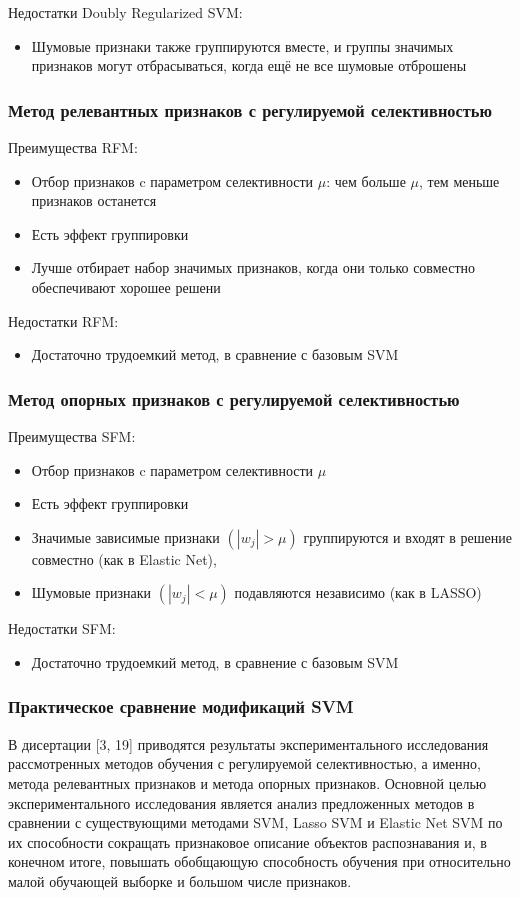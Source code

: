 \documentclass[12pt,a4paper]{article}
\begin{document}
Недостатки Doubly Regularized SVM:
\begin{itemize}
	\item  Шумовые признаки также группируются вместе,
	и группы значимых признаков могут отбрасываться,
	когда ещё не все шумовые отброшены
\end{itemize}

\subsubsection{Метод релевантных признаков с регулируемой селективностью}
Преимущества RFM:
\begin{itemize}
	\item Отбор признаков c параметром селективности $\mu$:
	чем больше $\mu$, тем меньше признаков останется
	\item Есть эффект группировки
	\item Лучше отбирает набор значимых признаков, когда
	они только совместно обеспечивают хорошее решени
\end{itemize}

Недостатки RFM:
\begin{itemize}
	\item Достаточно трудоемкий метод, в сравнение с базовым SVM
\end{itemize}

\subsubsection{Метод опорных признаков с регулируемой селективностью}
Преимущества SFM:
\begin{itemize}
	\item Отбор признаков c параметром селективности $\mu$
	\item Есть эффект группировки
	\item Значимые зависимые признаки $(|w_j| > \mu)$ группируются и входят в решение совместно (как в Elastic Net),
	\item Шумовые признаки $(|w_j| < \mu)$ подавляются независимо
	(как в LASSO)
\end{itemize}

Недостатки SFM:
\begin{itemize}
	\item Достаточно трудоемкий метод, в сравнение с базовым SVM
\end{itemize}

\subsubsection{Практическое сравнение модификаций SVM}
В дисертации [3, 19] приводятся результаты экспериментального исследования рассмотренных методов обучения с регулируемой селективностью, а именно, метода релевантных признаков и метода опорных признаков. Основной целью экспериментального исследования является анализ предложенных методов в сравнении с существующими методами SVM, Lasso SVM и Elastic Net SVM по их способности
сокращать признаковое описание объектов распознавания и, в конечном итоге, повышать обобщающую способность обучения при относительно малой обучающей выборке и большом числе признаков.
\end{document}
